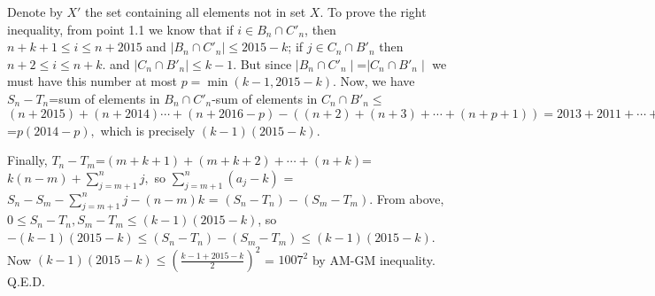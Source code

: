 \documentclass[11pt,a4paper]{article}
\begin{document}
\begin{enumerate}
Denote by $X'$ the set containing all elements not in set $X$. To prove the right inequality, from point 1.1 we know that if $i\in B_n\cap C'_n$, then $n+k+1\le i\le n+2015$ and $\mid B_n\cap C'_n\mid\le 2015-k$; if $j\in C_n\cap B'_n$ then $n+2\le i\le n+k.$ and $\mid C_n\cap B'_n\mid\le k-1$. But since $\mid B_n\cap C'_n\mid$=$\mid C_n\cap B'_n\mid$ we must have this number at most $p=\min(k-1, 2015-k)$. Now, we have $S_n-T_n$=sum of elements in $B_n\cap C'_n$-sum of elements in $C_n\cap B'_n\le$ $(n+2015)+(n+2014)\cdots +(n+2016-p)-((n+2)+(n+3)+\cdots +(n+p+1))=2013+2011+\cdots +(2013-2(p-1))=\frac{p}{2}\cdot (4028-2p)$=$p(2014-p),$ which is precisely $(k-1)(2015-k)$.

Finally, $T_n-T_m$=$(m+k+1)+(m+k+2)+\cdots +(n+k)$=$k(n-m)+\sum_{j=m+1}^n j,$ so $\sum_{j=m+1}^n(a_j-k)$ = $S_n-S_m-\sum_{j=m+1}^n j-(n-m)k$ = $(S_n-T_n)-(S_m-T_m)$. From above, $0\le S_n-T_n, S_m-T_m\le (k-1)(2015-k)$, so $-(k-1)(2015-k)\le (S_n-T_n)-(S_m-T_m)\le (k-1)(2015-k)$. Now $(k-1)(2015-k)\le(\frac{k-1+2015-k}{2})^{2}$ = $1007^2$ by AM-GM inequality. Q.E.D.

\end{enumerate}
\end{document}
